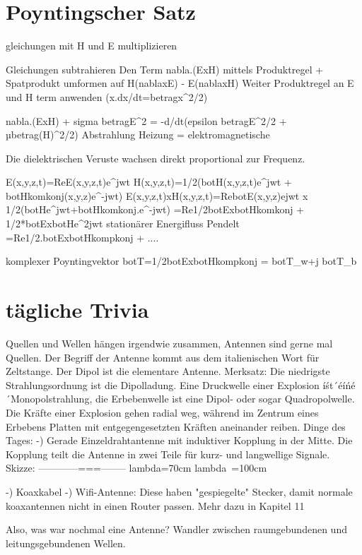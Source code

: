 \documentclass[a4paper]{article}
\begin{document}
\section{Poyntingscher Satz}
gleichungen mit H und E multiplizieren

Gleichungen subtrahieren
Den Term nabla.(ExH) mittels Produktregel + Spatprodukt umformen auf H(nablaxE) - E(nablaxH)
Weiter Produktregel an E und H term anwenden (x.dx/dt=betragx^2/2)

nabla.(ExH) + sigma betragE^2 = -d/dt(epsilon betragE^2/2 + µbetrag(H)^2/2)
Abstrahlung   Heizung         =          elektromagnetische


Die dielektrischen Veruste wachsen direkt proportional zur Frequenz.

E(x,y,z,t)=Re{E(x,y,z,t)e^jwt}
H(x,y,z,t)=1/2(botH(x,y,z,t)e^jwt + botHkomkonj(x,y,z)e^-jwt)
E(x,y,z,t)xH(x,y,z,t)=Re{botE(x,y,z)ejwt} x 1/2(botHe^jwt+botHkomkonj.e^-jwt)
                    =Re{1/2botExbotHkomkonj + 1/2*botExbotHe^2jwt}
                    stationärer Energifluss        Pendelt
                    =Re{1/2.botExbotHkompkonj} + ....

    komplexer Poyntingvektor botT=1/2botExbotHkompkonj = botT_w+j botT_b


\section{tägliche Trivia}
Quellen und Wellen hängen irgendwie zusammen, Antennen sind gerne mal Quellen.
Der Begriff der Antenne kommt aus dem italienischen Wort für Zeltstange.
Der Dipol ist die elementare Antenne.
Merksatz: Die niedrigste Strahlungsordnung ist die Dipolladung.
Eine Druckwelle einer Explosion íśt´éíńé´Monopolstrahlung, die Erbebenwelle ist
eine Dipol- oder sogar Quadropolwelle.
Die Kräfte einer Explosion gehen radial weg, während im Zentrum eines Erbebens
Platten mit entgegengesetzten Kräften aneinander reiben.
Dinge des Tages:
-) Gerade Einzeldrahtantenne mit induktiver Kopplung in der Mitte. Die Kopplung teilt die Antenne in zwei Teile für kurz- und langwellige Signale.
       Skizze: ------------===--------
                lambda=70cm   lambda~=100cm

-) Koaxkabel
-) Wifi-Antenne: Diese haben "gespiegelte" Stecker, damit normale koaxantennen 
    nicht in einen Router passen. Mehr dazu in Kapitel 11

Also, was war nochmal eine Antenne? Wandler zwischen raumgebundenen und
                                    leitungsgebundenen Wellen.
\end{document}
